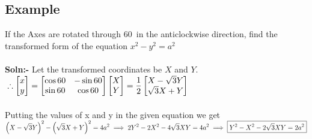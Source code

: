 \documentclass[14pt]{article}
\begin{document}
	\subsection{Example}
	\large{
		If the Axes are rotated through 60\textdegree $\,$ in the anticlockwise direction, find the transformed form of the equation $x^2-y^2=a^2$
	}
	\\ \\ \large{
		\textbf{Soln:-} Let the transformed coordinates be $X$ and $Y$.
		$\\ \\ \displaystyle \therefore \begin{bmatrix}
		x \\ y
		\end{bmatrix}=\begin{bmatrix}
			\cos60 & -\sin60\\
			\sin60 & \cos60
		\end{bmatrix}
		\begin{bmatrix}
		X \\ Y
		\end{bmatrix}
		=\frac{1}{2}\begin{bmatrix}
		X-\sqrt{3}Y \\ \sqrt{3}X+Y
		\end{bmatrix}$
		\\ \\ Putting the values of x and y in the given equation we get
		\\ $\displaystyle \left(X-\sqrt{3}Y\right)^2-\left(\sqrt{3}X+Y\right)^2=4a^2
		\\ \\ \implies 2Y^2-2X^2-4\sqrt{3}XY=4a^2 \implies \boxed{Y^2-X^2-2\sqrt{3}XY=2a^2}$
	}
\end{document}
